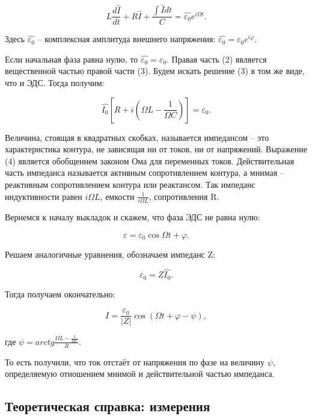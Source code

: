 \documentclass[a4paper, fontsize = 14pt]{article}
\begin{document}
\begin{equation}
	L \frac{d \hat{I}}{dt} + R\hat{I} + \frac{\int \hat{I} dt}{C} = \hat{\varepsilon_0} e^{i \Omega t}.
\end{equation}

Здесь $\hat{\varepsilon_0}$ -- комплексная амплитуда внешнего напряжения: $\hat{\varepsilon_0} = \varepsilon_0 e^{i \varphi}$. 

Если начальная фаза равна нулю, то $\hat{\varepsilon_0} = \varepsilon_0$. Правая часть (2) является вещественной частью правой части (3). Будем искать решение (3) в том же виде, что и ЭДС. Тогда получим:

\begin{equation}
	\hat{I_0}[R+i(\Omega L - \frac{1}{\Omega C})] = \varepsilon_0.
\end{equation}

Величина, стоящая в квадратных скобках, называется импедансом -- это характеристика контура, не зависящая ни от токов, ни от напряжений. Выражение (4) является обобщением законом Ома для переменных токов. Действительная часть импеданса называется активным сопротивлением контура, а мнимая -- реактивным сопротивлением контура или реактансом. Так импеданс индуктивности равен $i\Omega L$, емкости $\frac{1}{i \Omega L}$, сопротивления R.

Вернемся к началу выкладок и скажем, что фаза ЭДС не равна нулю:

\begin{equation}
	\varepsilon = \varepsilon_0 \cos{\Omega t + \varphi}.
\end{equation}

Решаем аналогичные уравнения, обозначаем импеданс Z:

\begin{equation}
	\hat{\varepsilon_0} = Z \hat{I_0}.
\end{equation}

Тогда получаем окончательно:

\begin{equation}
	I = \frac{\varepsilon_0}{|Z|} \cos{(\Omega t + \varphi - \psi)},
\end{equation}

где $\psi = arctg\frac{\Omega L - \frac{1}{\Omega C}}{R}$. 

То есть получили, что ток отстаёт от напряжения по фазе на величину $\psi$, определяемую отношением мнимой и действительной частью импеданса. 

\subsection*{Теоретическая справка: измерения}
\end{document}
